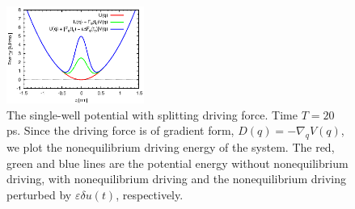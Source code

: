 \documentclass[]{tMPH2e}
\newcommand{\eps}{\varepsilon}
\begin{document}
\begin{figure}
  \centering
  \includegraphics[width=0.4\textwidth]{figs/fig-split-pot.eps}
  \caption{The single-well potential with  splitting driving
    force. Time $T = 20$ ps.  Since the driving force is
    of gradient form, $ D( q) = -\nabla_{q}V( q)$,
    we plot the nonequilibrium driving energy of the system.  The red,
    green and blue lines are the potential energy without
    nonequilibrium driving, with nonequilibrium driving and
    the nonequilibrium driving perturbed by $\eps\delta u(t)$,
    respectively.  }
  \label{fig:tmp4}
\end{figure}
\end{document}
